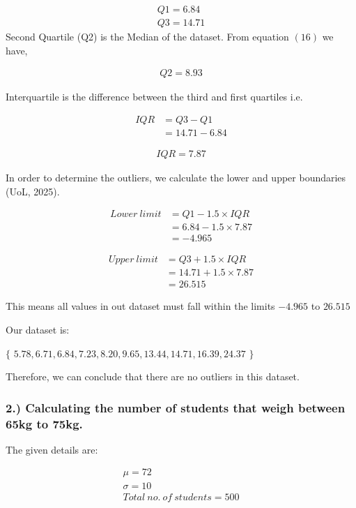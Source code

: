 \documentclass[a4paper]{report}
\begin{document}
\begin{align}
    \boxed{Q1=6.84} \\
    \boxed{Q3=14.71}
\end{align}
Second Quartile (Q2) is the Median of the dataset. From equation $(16)$ we have,

\begin{align}
    \boxed{Q2=8.93}
\end{align}


Interquartile is the difference between the third and first quartiles i.e.

\begin{align*}
    IQR&=Q3-Q1 \\
    &=14.71-6.84
\end{align*}

\begin{align}
    \boxed{IQR=7.87}
\end{align}

In order to determine the outliers, we calculate the lower and upper boundaries (UoL, 2025).

\begin{align*}
    Lower\ limit &= Q1-1.5\times IQR \\
    &=6.84-1.5\times 7.87 \\
    &=-4.965
\end{align*}

\begin{align*}
    Upper\ limit&=Q3+1.5\times IQR \\
    &=14.71+1.5\times 7.87 \\
    &=26.515
\end{align*}

This means all values in out dataset must fall within the limits $-4.965$ to $26.515$

Our dataset is:

$\{ $ $5.78, 6.71, 6.84, 7.23, 8.20, 9.65, 13.44, 14.71, 16.39, 24.37$  $\}$

Therefore, we can conclude that there are no outliers in this dataset.

\subsubsection*{2.) Calculating the number of students that weigh between 65kg to 75kg.}

The given details are:

\begin{align}
    \mu =72 \\
    \sigma = 10 \\
    Total\ no.\ of\ students=500
\end{align}
\end{document}
